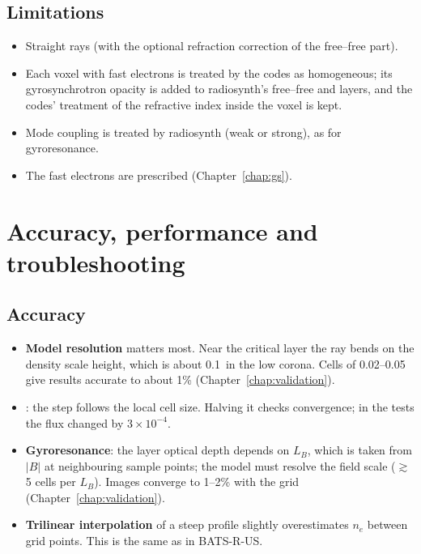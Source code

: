 \section{Limitations}
\begin{itemize}[itemsep=1pt]
\item Straight rays (with the optional refraction correction of the free--free part).
\item Each voxel with fast electrons is treated by the codes as homogeneous; its
  gyrosynchrotron opacity is added to radiosynth's free--free and layers, and the codes'
  treatment of the refractive index inside the voxel is kept.
\item Mode coupling is treated by radiosynth (weak or strong), as for gyroresonance.
\item The fast electrons are prescribed (Chapter~\ref{chap:gs}).
\end{itemize}

\chapter{Accuracy, performance and troubleshooting}

\section{Accuracy}
\begin{itemize}[itemsep=2pt]
\item \textbf{Model resolution} matters most. Near the critical layer the ray bends on
      the density scale height, which is about 0.1\,\rsun{} in the low corona. Cells of
      0.02--0.05\,\rsun{} give results accurate to about 1\%
      (Chapter~\ref{chap:validation}).
\item \textbf{}: the step follows the local cell size. Halving it
      checks convergence; in the tests the flux changed by $3\times10^{-4}$.
\item \textbf{Gyroresonance}: the layer optical depth depends on $L_B$, which is taken from
      $|B|$ at neighbouring sample points; the model must resolve the field scale
      ($\gtrsim$5 cells per $L_B$). Images converge to 1--2\% with the grid
      (Chapter~\ref{chap:validation}).
\item \textbf{Trilinear interpolation} of a steep profile slightly overestimates $n_e$
      between grid points. This is the same as in BATS-R-US.
\end{itemize}

